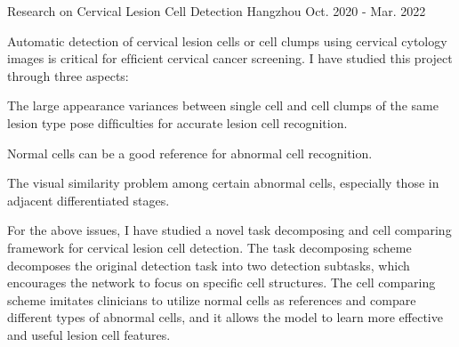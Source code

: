 
\begin{cventries}

	\cventry
	{} %
	{Research on Cervical Lesion Cell Detection} %
	{Hangzhou} %
	{Oct. 2020 - Mar. 2022} %
	{
		Automatic detection of cervical lesion cells or cell clumps using cervical cytology images is critical for efﬁcient cervical cancer screening. I have studied this project through three aspects: \newline
		\vspace{4.5mm}
		\begin{cvitems} %
			\item{The large appearance variances between single cell and cell clumps of the same lesion type pose difﬁculties for accurate lesion cell recognition.}
			\item{Normal cells can be a good reference for abnormal cell recognition.}
			\item{The visual similarity problem among certain abnormal cells, especially those in adjacent differentiated stages.}
		\end{cvitems}
		\vspace{4.5mm}
		For the above issues, I have studied a novel task decomposing and cell comparing framework for cervical lesion cell detection. The task decomposing scheme decomposes the original detection task into two detection subtasks, which encourages the network to focus on specific cell structures. The cell comparing scheme imitates clinicians to utilize normal cells as references and compare different types of abnormal cells, and it allows the model to learn more effective and useful lesion cell features.
	}


\end{cventries}
